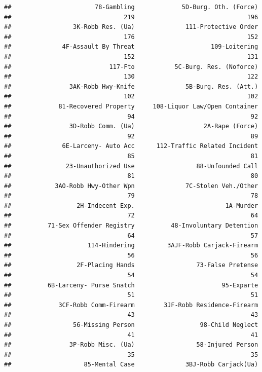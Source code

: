 \documentclass[12pt,]{book}
\theoremstyle{definition}
\theoremstyle{definition}
\theoremstyle{remark}
\begin{document}
\begin{verbatim}
##                       78-Gambling             5D-Burg. Oth. (Force) 
##                               219                               196 
##                 3K-Robb Res. (Ua)              111-Protective Order 
##                               176                               152 
##              4F-Assault By Threat                     109-Loitering 
##                               152                               131 
##                           117-Fto           5C-Burg. Res. (Noforce) 
##                               130                               122 
##                3AK-Robb Hwy-Knife              5B-Burg. Res. (Att.) 
##                               102                               102 
##             81-Recovered Property     108-Liquor Law/Open Container 
##                                94                                92 
##                3D-Robb Comm. (Ua)                   2A-Rape (Force) 
##                                92                                89 
##              6E-Larceny- Auto Acc      112-Traffic Related Incident 
##                                85                                81 
##               23-Unauthorized Use                 88-Unfounded Call 
##                                81                                80 
##            3AO-Robb Hwy-Other Wpn              7C-Stolen Veh./Other 
##                                79                                78 
##                  2H-Indecent Exp.                         1A-Murder 
##                                72                                64 
##          71-Sex Offender Registry          48-Involuntary Detention 
##                                64                                57 
##                     114-Hindering         3AJF-Robb Carjack-Firearm 
##                                56                                56 
##                  2F-Placing Hands                 73-False Pretense 
##                                54                                54 
##          6B-Larceny- Purse Snatch                        95-Exparte 
##                                51                                51 
##             3CF-Robb Comm-Firearm        3JF-Robb Residence-Firearm 
##                                43                                43 
##                 56-Missing Person                  98-Child Neglect 
##                                41                                41 
##                3P-Robb Misc. (Ua)                 58-Injured Person 
##                                35                                35 
##                    85-Mental Case              3BJ-Robb Carjack(Ua) 

\end{verbatim}
\end{document}

